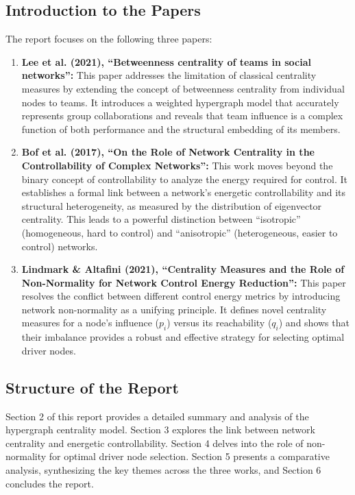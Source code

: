\documentclass[10pt, a4paper]{article}
\begin{document}
\subsection*{Introduction to the Papers}
The report focuses on the following three papers:
\begin{enumerate}
    \item \textbf{Lee et al. (2021), ``Betweenness centrality of teams in social networks'':} This paper addresses the limitation of classical centrality measures by extending the concept of betweenness centrality from individual nodes to teams. It introduces a weighted hypergraph model that accurately represents group collaborations and reveals that team influence is a complex function of both performance and the structural embedding of its members.
    
    \item \textbf{Bof et al. (2017), ``On the Role of Network Centrality in the Controllability of Complex Networks'':} This work moves beyond the binary concept of controllability to analyze the energy required for control. It establishes a formal link between a network's energetic controllability and its structural heterogeneity, as measured by the distribution of eigenvector centrality. This leads to a powerful distinction between ``isotropic'' (homogeneous, hard to control) and ``anisotropic'' (heterogeneous, easier to control) networks.
    
    \item \textbf{Lindmark \& Altafini (2021), ``Centrality Measures and the Role of Non-Normality for Network Control Energy Reduction'':} This paper resolves the conflict between different control energy metrics by introducing network non-normality as a unifying principle. It defines novel centrality measures for a node's influence ($p_i$) versus its reachability ($q_i$) and shows that their imbalance provides a robust and effective strategy for selecting optimal driver nodes.
\end{enumerate}

\subsection*{Structure of the Report}
Section 2 of this report provides a detailed summary and analysis of the hypergraph centrality model. Section 3 explores the link between network centrality and energetic controllability. Section 4 delves into the role of non-normality for optimal driver node selection. Section 5 presents a comparative analysis, synthesizing the key themes across the three works, and Section 6 concludes the report.
\end{document}
